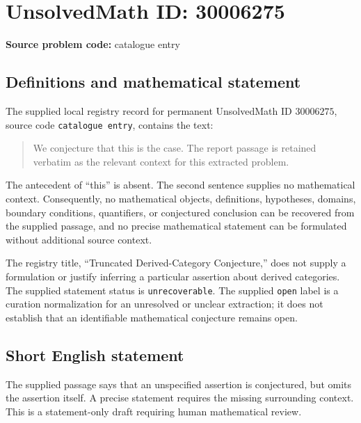 \documentclass[11pt]{article}
\begin{document}
\section*{UnsolvedMath ID: 30006275}
\textbf{Source problem code:} catalogue entry
\subsection{Definitions and mathematical statement}
The supplied local registry record for permanent UnsolvedMath ID \(30006275\), source code \texttt{catalogue entry}, contains the text:
\begin{quote}
We conjecture that this is the case. The report passage is retained verbatim as the relevant context for this extracted problem.
\end{quote}
The antecedent of ``this'' is absent. The second sentence supplies no mathematical context. Consequently, no mathematical objects, definitions, hypotheses, domains, boundary conditions, quantifiers, or conjectured conclusion can be recovered from the supplied passage, and no precise mathematical statement can be formulated without additional source context.

The registry title, ``Truncated Derived-Category Conjecture,'' does not supply a formulation or justify inferring a particular assertion about derived categories. The supplied statement status is \texttt{unrecoverable}. The supplied \texttt{open} label is a curation normalization for an unresolved or unclear extraction; it does not establish that an identifiable mathematical conjecture remains open.
\subsection{Short English statement}
The supplied passage says that an unspecified assertion is conjectured, but omits the assertion itself. A precise statement requires the missing surrounding context. This is a statement-only draft requiring human mathematical review.
\end{document}
